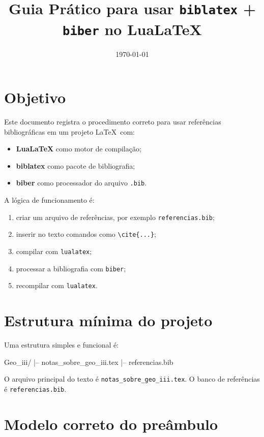 \documentclass[12pt,a4paper]{article}
\title{Guia Prático para usar \texttt{biblatex} + \texttt{biber} no LuaLaTeX}
\author{}
\date{\today}
\newcommand{\arquivo}[1]{\texttt{#1}}
\newcommand{\comando}[1]{\texttt{#1}}
\begin{document}
\maketitle
\onehalfspacing

\section{Objetivo}

Este documento registra o procedimento correto para usar referências bibliográficas em um projeto \LaTeX\ com:

\begin{itemize}[leftmargin=1.5cm]
    \item \textbf{LuaLaTeX} como motor de compilação;
    \item \textbf{biblatex} como pacote de bibliografia;
    \item \textbf{biber} como processador do arquivo \arquivo{.bib}.
\end{itemize}

A lógica de funcionamento é:

\begin{enumerate}[leftmargin=1.5cm]
    \item criar um arquivo de referências, por exemplo \arquivo{referencias.bib};
    \item inserir no texto comandos como \comando{\textbackslash cite\{...\}};
    \item compilar com \comando{lualatex};
    \item processar a bibliografia com \comando{biber};
    \item recompilar com \comando{lualatex}.
\end{enumerate}

\section{Estrutura mínima do projeto}

Uma estrutura simples e funcional é:

\begin{bloco}
Geo_iii/
|-- notas_sobre_geo_iii.tex
|-- referencias.bib
\end{bloco}

O arquivo principal do texto é \arquivo{notas_sobre_geo_iii.tex}.  
O banco de referências é \arquivo{referencias.bib}.

\section{Modelo correto do preâmbulo}
\end{document}
